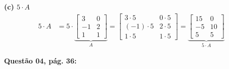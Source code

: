 \documentclass[a4paper,12pt]{article}
\begin{document}
\textbf{(c) $5 \cdot A$}
\begin{align*}
    5 \cdot A &=
    5 \cdot
    \underbrace{
    \begin{bmatrix}
        3 & 0\\
        -1 & 2\\
        1 & 1
    \end{bmatrix}}_{A} 
    =
    \begin{bmatrix}
            3 \cdot 5 & 0 \cdot 5\\
            (-1) \cdot 5 & 2 \cdot 5\\
            1 \cdot 5 & 1 \cdot 5
    \end{bmatrix}
    =
    \underbrace{\begin{bmatrix}
        15 & 0\\
        -5 & 10\\
        5 & 5
    \end{bmatrix}}_{5 \cdot A}
\end{align*}

\textbf{Questão 04, pág. 36:}\\
\end{document}

